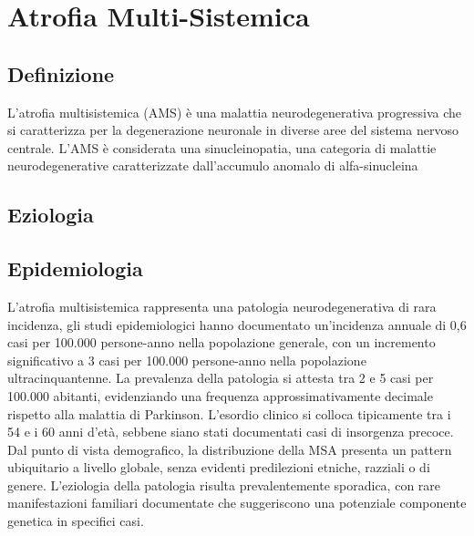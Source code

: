 \section{Atrofia Multi-Sistemica}

\subsection{Definizione}
L'atrofia multisistemica (AMS) è una malattia neurodegenerativa progressiva che si caratterizza per la degenerazione neuronale in diverse aree del sistema nervoso centrale. L'AMS è considerata una sinucleinopatia, una categoria di malattie neurodegenerative caratterizzate dall'accumulo anomalo di alfa-sinucleina

\subsection{Eziologia}

\subsection{Epidemiologia}
L'atrofia multisistemica rappresenta una patologia neurodegenerativa di rara incidenza, gli studi epidemiologici hanno documentato un'incidenza annuale di 0,6 casi per 100.000 persone-anno nella popolazione generale, con un incremento significativo a 3 casi per 100.000 persone-anno nella popolazione ultracinquantenne. La prevalenza della patologia si attesta tra 2 e 5 casi per 100.000 abitanti, evidenziando una frequenza approssimativamente decimale rispetto alla malattia di Parkinson. L'esordio clinico si colloca tipicamente tra i 54 e i 60 anni d'età, sebbene siano stati documentati casi di insorgenza precoce. Dal punto di vista demografico, la distribuzione della MSA presenta un pattern ubiquitario a livello globale, senza evidenti predilezioni etniche, razziali o di genere. L'eziologia della patologia risulta prevalentemente sporadica, con rare manifestazioni familiari documentate che suggeriscono una potenziale componente genetica in specifici casi.

